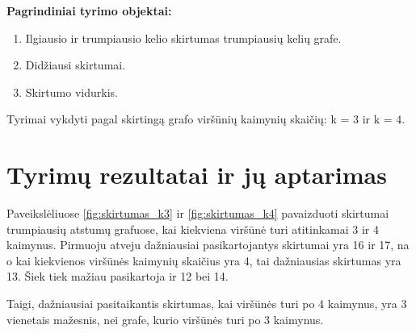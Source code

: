 \documentclass[bibliography=totoc]{article}
\begin{document}
\textbf{Pagrindiniai tyrimo objektai:}
\begin{enumerate}
    \item Ilgiausio ir trumpiausio kelio skirtumas trumpiausių kelių grafe.
    \item Didžiausi skirtumai.
    \item Skirtumo vidurkis.\\
\end{enumerate}

Tyrimai vykdyti pagal skirtingą grafo viršūnių kaimynių skaičių: k = 3 ir k = 4.


\newpage
\section{Tyrimų rezultatai ir jų aptarimas}

Paveikslėliuose \ref{fig:skirtumas_k3} ir \ref{fig:skirtumas_k4} pavaizduoti skirtumai trumpiausių atstumų grafuose, kai kiekviena viršūnė turi atitinkamai 3 ir 4 kaimynus.
Pirmuoju atveju dažniausiai pasikartojantys skirtumai yra 16 ir 17, na o kai kiekvienos viršūnės kaimynių skaičius yra 4, tai dažniausias skirtumas yra 13. Šiek tiek mažiau pasikartoja ir 12 bei 14.
 
Taigi, dažniausiai pasitaikantis skirtumas, kai viršūnės turi po 4 kaimynus, yra 3 vienetais mažesnis, nei grafe, kurio viršūnės turi po 3 kaimynus.
\end{document}
